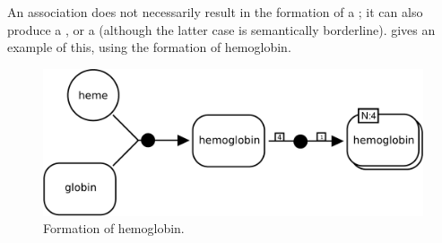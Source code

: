 An association does not necessarily result in the formation of a ; it can also produce a , or a  (although the latter case is semantically borderline).   gives an example of this, using the formation of hemoglobin.

\begin{figure}[H]
  \centering
  \includegraphics[scale = 0.3]{examples/association-multimerisation}
  \caption{Formation of hemoglobin.}
  \label{fig:assoc-multi}
\end{figure}



